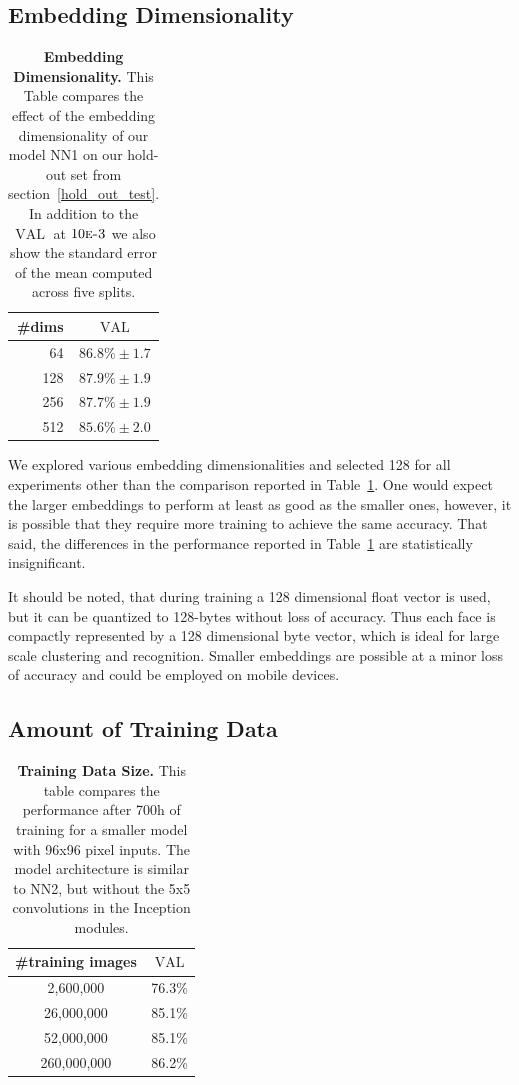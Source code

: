 \documentclass[10pt,twocolumn,letterpaper]{article}
\DeclareMathOperator{\val}{VAL}
\begin{document}
\subsection{Embedding Dimensionality}

\begin{table}
\begin{center}
\begin{tabular}{|r|c|}
\hline
\#dims & $\val$ \\
\hline\hline
64 & $86.8\%\pm1.7$ \\
128 & $87.9\%\pm1.9$ \\
256 & $87.7\%\pm1.9$ \\
512 & $85.6\%\pm2.0$ \\
\hline
\end{tabular}
\end{center}
\caption{{\bf Embedding Dimensionality.} This Table compares the effect of the
  embedding dimensionality of our model NN1 on our hold-out set from
  section~\ref{hold_out_test}. In addition to the $\val$ at
  $10\text{\sc{e}-3}$ we also show the standard error of the mean computed
  across five splits.}
\label{tab:embedding_dims}
\end{table}
We explored various embedding dimensionalities and selected 128 for all
experiments other than the comparison reported in
Table~\ref{tab:embedding_dims}. One would expect the larger embeddings to
perform at least as good as the smaller ones, however, it is possible that they
require more training to achieve the same accuracy. That said, the differences
in the performance reported in Table~\ref{tab:embedding_dims} are statistically
insignificant.

It should be noted, that during training a 128 dimensional float vector is
used, but it can be quantized to \mbox{128-bytes} without loss of accuracy. Thus each
face is compactly represented by a 128 dimensional byte vector, which is ideal
for large scale clustering and recognition. Smaller embeddings are possible at
a minor loss of accuracy and could be employed on mobile devices.

\subsection{Amount of Training Data}

\begin{table}
\begin{center}
\begin{tabular}{|c|c|}
\hline
\#training images & $\val$ \\
\hline\hline
2,600,000 & 76.3\% \\
26,000,000 & 85.1\% \\
52,000,000 & 85.1\% \\
260,000,000 & 86.2\% \\
\hline
\end{tabular}
\end{center}
\caption{{\bf Training Data Size.} This table compares the performance after
  700h of training for a smaller model with 96x96 pixel inputs. The model
  architecture is similar to NN2, but without the 5x5 convolutions in the
  Inception modules.}
\label{tab:training_data}
\end{table}
\end{document}
